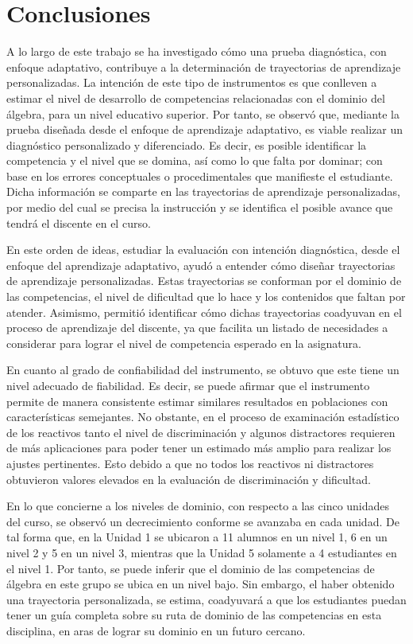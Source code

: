 \documentclass[spanish]{textolivre}
\begin{document}
\section{Conclusiones}\label{sec-autores}
A lo largo de este trabajo se ha investigado cómo una prueba diagnóstica, con enfoque adaptativo, contribuye a la determinación de trayectorias de aprendizaje personalizadas. La intención de este tipo de instrumentos es que conlleven a estimar el nivel de desarrollo de competencias relacionadas con el dominio del álgebra, para un nivel educativo superior. Por tanto, se observó que, mediante la prueba diseñada desde el enfoque de aprendizaje adaptativo, es viable realizar un diagnóstico personalizado y diferenciado. Es decir, es posible identificar la competencia y el nivel que se domina, así como lo que falta por dominar; con base en los errores conceptuales o procedimentales que manifieste el estudiante. Dicha información se comparte en las trayectorias de aprendizaje personalizadas, por medio del cual se precisa la instrucción y se identifica el posible avance que tendrá el discente en el curso.

En este orden de ideas, estudiar la evaluación con intención diagnóstica, desde el enfoque del aprendizaje adaptativo, ayudó a entender cómo diseñar trayectorias de aprendizaje personalizadas. Estas trayectorias se conforman por el dominio de las competencias, el nivel de dificultad que lo hace y los contenidos que faltan por atender. Asimismo, permitió identificar cómo dichas trayectorias coadyuvan en el proceso de aprendizaje del discente, ya que facilita un listado de necesidades a considerar para lograr el nivel de competencia esperado en la asignatura. 

En cuanto al grado de confiabilidad del instrumento, se obtuvo que este tiene un nivel adecuado de fiabilidad. Es decir, se puede afirmar que el instrumento permite de manera consistente estimar similares resultados en poblaciones con características semejantes. No obstante, en el proceso de examinación estadístico de los reactivos tanto el nivel de discriminación y algunos distractores requieren de más aplicaciones para poder tener un estimado más amplio para realizar los ajustes pertinentes. Esto debido a que no todos los reactivos ni distractores obtuvieron valores elevados en la evaluación de discriminación y dificultad.

En lo que concierne a los niveles de dominio, con respecto a las cinco unidades del curso, se observó un decrecimiento conforme se avanzaba en cada unidad. De tal forma que, en la Unidad 1 se ubicaron a 11 alumnos en un nivel 1, 6 en un nivel 2 y 5 en un nivel 3, mientras que la Unidad 5 solamente a 4 estudiantes en el nivel 1. Por tanto, se puede inferir que el dominio de las competencias de álgebra en este grupo se ubica en un nivel bajo. Sin embargo, el haber obtenido una trayectoria personalizada, se estima, coadyuvará a que los estudiantes puedan tener un guía completa sobre su ruta de dominio de las competencias en esta disciplina, en aras de lograr su dominio en un futuro cercano.
\end{document}
